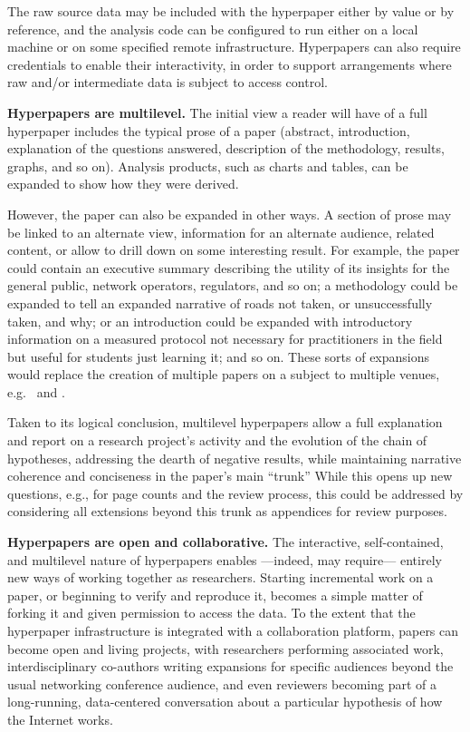 \documentclass[sigconf,10pt]{acmart}
\begin{document}
The raw source data may be included with the hyperpaper either by value or by
reference, and the analysis code can be configured to run either on a local
machine or on some specified remote infrastructure. Hyperpapers can also require
credentials to enable their interactivity, in order to support arrangements
where raw and/or intermediate data is subject to access control.

\textbf{Hyperpapers are multilevel.} The initial view a reader will have of a
full hyperpaper includes the typical prose of a paper (abstract, introduction,
explanation of the questions answered, description of the methodology, results,
graphs, and so on). Analysis products, such as charts and tables, can be
expanded to show how they were derived.

However, the paper can also be expanded in other ways. A section of prose may
be linked to an alternate view, information for an alternate audience, related
content, or allow to drill down on some interesting result. For example, the
paper could contain an executive summary describing the utility of its insights
for the general public, network operators, regulators, and so on; a methodology
could be expanded to tell an expanded narrative of roads not taken, or
unsuccessfully taken, and why; or an introduction could be expanded with
introductory information on a measured protocol not necessary for practitioners
in the field but useful for students just learning it; and so on.  These sorts
of expansions would replace the creation of multiple papers on a subject to
multiple venues, e.g.~\cite{Dhamdhere18} and \cite{Clark18}.

Taken to its logical conclusion, multilevel hyperpapers allow a full explanation
and report on a research project's activity and the evolution of the chain of
hypotheses, addressing the dearth of negative results, while maintaining
narrative coherence and conciseness in the paper's main ``trunk'' While this
opens up new questions, e.g., for page counts and the review process, this
could be addressed by considering all extensions beyond this trunk as appendices
for review purposes.

\textbf{Hyperpapers are open and collaborative.} The interactive,
self-contained, and multilevel nature of hyperpapers enables ---indeed, may
require--- entirely new ways of working together as researchers. Starting
incremental work on a paper, or beginning to verify and reproduce it, becomes a
simple matter of forking it and given permission to access the data. To the extent
that the hyperpaper infrastructure is integrated with a collaboration platform,
papers can become open and living projects, with researchers performing
associated work, interdisciplinary co-authors writing expansions for specific
audiences beyond the usual networking conference audience, and even reviewers
becoming part of a long-running, data-centered conversation about a particular
hypothesis of how the Internet works.
\end{document}
